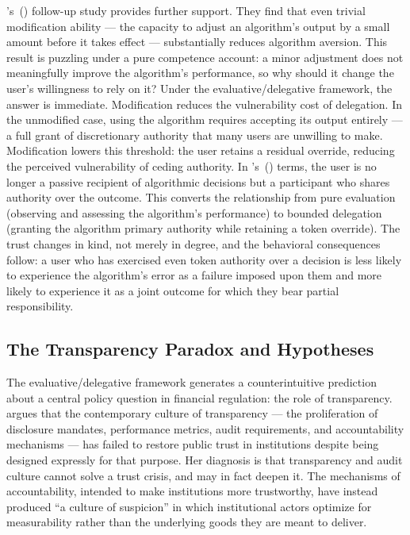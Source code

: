 \citeauthor{DietvorstSimmonsMassey2018}'s~(\citeyear{DietvorstSimmonsMassey2018}) follow-up study provides further support. They find that even trivial modification ability --- the capacity to adjust an algorithm's output by a small amount before it takes effect --- substantially reduces algorithm aversion. This result is puzzling under a pure competence account: a minor adjustment does not meaningfully improve the algorithm's performance, so why should it change the user's willingness to rely on it? Under the evaluative/delegative framework, the answer is immediate. Modification reduces the vulnerability cost of delegation. In the unmodified case, using the algorithm requires accepting its output entirely --- a full grant of discretionary authority that many users are unwilling to make. Modification lowers this threshold: the user retains a residual override, reducing the perceived vulnerability of ceding authority. In \citeauthor{Nickel2012}'s~(\citeyear{Nickel2012}) terms, the user is no longer a passive recipient of algorithmic decisions but a participant who shares authority over the outcome. This converts the relationship from pure evaluation (observing and assessing the algorithm's performance) to bounded delegation (granting the algorithm primary authority while retaining a token override). The trust changes in kind, not merely in degree, and the behavioral consequences follow: a user who has exercised even token authority over a decision is less likely to experience the algorithm's error as a failure imposed upon them and more likely to experience it as a joint outcome for which they bear partial responsibility.

\subsection{The Transparency Paradox and Hypotheses}
\label{subsec:transparency}

The evaluative/delegative framework generates a counterintuitive prediction about a central policy question in financial regulation: the role of transparency. \citet{ONeill2002, ONeill2014} argues that the contemporary culture of transparency --- the proliferation of disclosure mandates, performance metrics, audit requirements, and accountability mechanisms --- has failed to restore public trust in institutions despite being designed expressly for that purpose. Her diagnosis is that transparency and audit culture cannot solve a trust crisis, and may in fact deepen it. The mechanisms of accountability, intended to make institutions more trustworthy, have instead produced ``a culture of suspicion'' in which institutional actors optimize for measurability rather than the underlying goods they are meant to deliver.

